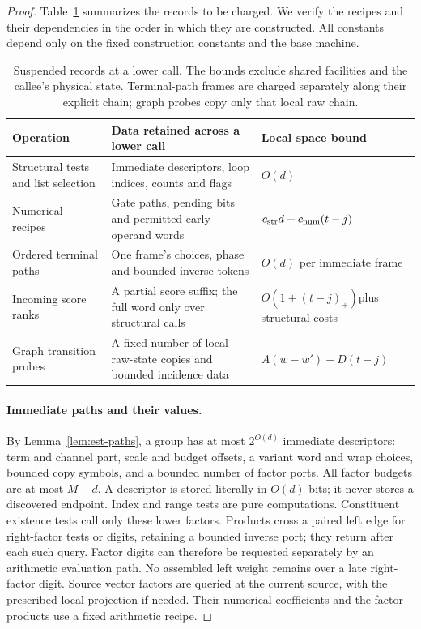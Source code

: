 \begin{proof}
Table~\ref{tab:ctrl-records} summarizes the records to be charged.
We verify the recipes and their dependencies in the order in which they
are constructed.  All constants depend only on the fixed construction
constants and the base machine.

\begin{table}[tbp]
\centering
\small
\renewcommand{\arraystretch}{1.15}
\begin{tabular}{@{}p{}p{}p{}@{}}
\toprule
Operation & Data retained across a lower call & Local space bound \\
\midrule
Structural tests and list selection
 & Immediate descriptors, loop indices, counts and flags
 & $O(d)$ \\
Numerical recipes
 & Gate paths, pending bits and permitted early operand words
 & $c_{\rm str}d+c_{\rm num}(t-j)$ \\
Ordered terminal paths
 & One frame's choices, phase and bounded inverse tokens
 & $O(d)$ per immediate frame \\
Incoming score ranks
 & A partial score suffix; the full word only over structural calls
 & $O(1+(t-j)_+)$\newline plus structural costs \\
Graph transition probes
 & A fixed number of local raw-state copies and bounded incidence data
 & $A(w-w')+D(t-j)$ \\
\bottomrule
\end{tabular}
\caption{Suspended records at a lower call.  The bounds exclude shared
facilities and the callee's physical state.  Terminal-path frames are
charged separately along their explicit chain; graph probes copy only
that local raw chain.}
\label{tab:ctrl-records}
\end{table}

\paragraph{Immediate paths and their values.}
By Lemma~\ref{lem:est-paths}, a group has at most $2^{O(d)}$ immediate
descriptors: term and channel part, scale and budget offsets, a variant
word and wrap choices, bounded copy symbols, and a bounded number of
factor ports.  All factor budgets are at most $M-d$.  A descriptor is
stored literally in $O(d)$ bits; it never stores a discovered endpoint.
Index and range tests are pure computations.  Constituent existence
tests call only these lower factors.  Products cross a paired left
edge for right-factor tests or digits, retaining a bounded inverse
port; they return after each such query.  Factor digits can therefore be
requested separately by an arithmetic evaluation path.  No assembled
left weight remains over a late right-factor digit.  Source vector
factors are queried at the current source, with the prescribed local
projection if needed.  Their numerical coefficients and the factor
products use a fixed arithmetic recipe.


\end{proof}
